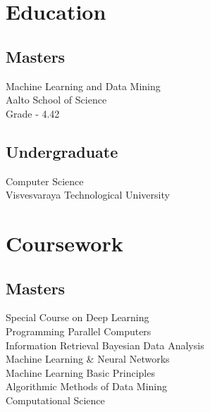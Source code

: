 \documentclass[]{deedy-resume}
\begin{document}
%
%
\lastupdated

%
%

%
%

\begin{minipage}[t]{0.33\textwidth} 


\section{Education} 
\subsection{Masters}
Machine Learning and Data Mining\\
Aalto School of Science\\
Grade - 4.42\\
\sectionsep

\subsection{Undergraduate}
Computer Science\\
Visvesvaraya Technological University\\



\section{Coursework}
\subsection{Masters}
\textbullet{} Special Course on Deep Learning\\
\textbullet{} Programming Parallel Computers \\
\textbullet{} Information Retrieval
\textbullet{} Bayesian Data Analysis\\
\textbullet{} Machine Learning \& Neural Networks\\
\textbullet{} Machine Learning Basic Principles\\
\textbullet{} Algorithmic Methods of Data Mining\\
\textbullet{} Computational Science \\
\sectionsep


\end{minipage}
\end{document}
